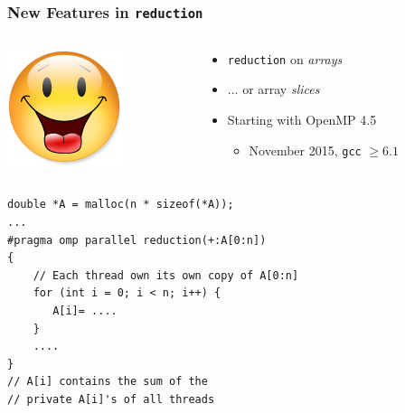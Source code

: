 \documentclass{beamer}
\begin{document}
\begin{frame}[fragile=singleslide]
  \frametitle{New Features in \texttt{reduction}}

  \begin{columns}[b]
    \begin{column}{.1\textwidth}
      \includegraphics[width=\textwidth]{Content.png}
    \end{column}
    \begin{column}{.9\textwidth}
      \begin{itemize}
      \item \texttt{reduction} on  \emph{arrays}
      \item ... or array \emph{slices}
      \item Starting with OpenMP 4.5
        \begin{itemize}
        \item November 2015, \texttt{gcc} $\geq 6.1$
        \end{itemize}
      \end{itemize}
    \end{column}
  \end{columns}

\bigskip
  
\begin{verbatim}
double *A = malloc(n * sizeof(*A));
...
#pragma omp parallel reduction(+:A[0:n])
{
    // Each thread own its own copy of A[0:n]
    for (int i = 0; i < n; i++) {
       A[i]= ....
    }
    ....
}
// A[i] contains the sum of the 
// private A[i]'s of all threads
\end{verbatim} 
\end{frame}
\end{document}
